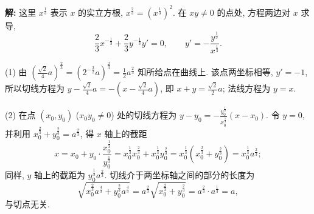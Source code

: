 \documentclass[UTF8,openany]{ctexbook}
\theoremstyle{chinesetextbook}
\newenvironment{cnsolution}{\par\indent\textbf{解:} \ignorespaces}{\par}
\begin{document}
\begin{cnsolution}
这里 $x^{\frac13}$ 表示 $x$ 的实立方根, $x^{\frac23}=\left(x^{\frac13}\right)^2$. 在 $xy\ne0$ 的点处, 方程两边对 $x$ 求导,
\[
\frac23x^{-\frac13}+\frac23y^{-\frac13}y'=0,\qquad y'=-\frac{y^{\frac13}}{x^{\frac13}}.
\]

(1) 由 $\displaystyle\left(\frac{\sqrt2}4a\right)^{\frac23}=\left(2^{-\frac32}a\right)^{\frac23}=\frac12a^{\frac23}$ 知所给点在曲线上. 该点两坐标相等, $y'=-1$, 所以切线方程为 $\displaystyle y-\frac{\sqrt2}4a=-\left(x-\frac{\sqrt2}4a\right)$, 即 $\displaystyle x+y=\frac{\sqrt2}2a$; 法线方程为 $y=x$.

(2) 在点 $(x_0,y_0)$ ($x_0y_0\ne0$) 处的切线方程为 $\displaystyle y-y_0=-\frac{y_0^{\frac13}}{x_0^{\frac13}}(x-x_0)$. 令 $y=0$, 并利用 $x_0^{\frac23}+y_0^{\frac23}=a^{\frac23}$, 得 $x$ 轴上的截距
\[
x=x_0+y_0\cdot\frac{x_0^{\frac13}}{y_0^{\frac13}}=x_0^{\frac13}x_0^{\frac23}+x_0^{\frac13}y_0^{\frac23}=x_0^{\frac13}\left(x_0^{\frac23}+y_0^{\frac23}\right)=x_0^{\frac13}a^{\frac23};
\]
同样, $y$ 轴上的截距为 $y_0^{\frac13}a^{\frac23}$. 切线介于两坐标轴之间的部分的长度为
\[
\sqrt{x_0^{\frac23}a^{\frac43}+y_0^{\frac23}a^{\frac43}}=a^{\frac23}\sqrt{x_0^{\frac23}+y_0^{\frac23}}=a^{\frac23}\cdot a^{\frac13}=a,
\]
与切点无关.
\end{cnsolution}
\end{document}
